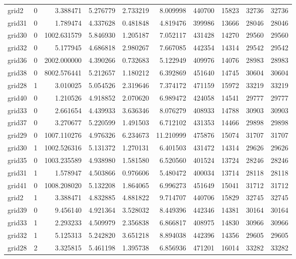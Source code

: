 \begin{longtable}{|l|r|r|r|r|r|r|r|r|r|}
grid2 & 0 & 3.388471 & 5.276779 & 2.733219 & 8.009998 & 440700 & 15823 & 32736 & 32736 \\
grid31 & 0 & 1.789474 & 4.337628 & 0.481848 & 4.819476 & 399986 & 13666 & 28046 & 28046 \\
grid30 & 0 & 1002.631579 & 5.846930 & 1.205187 & 7.052117 & 431428 & 14270 & 29560 & 29560 \\
grid32 & 0 & 5.177945 & 4.686818 & 2.980267 & 7.667085 & 442354 & 14314 & 29542 & 29542 \\
grid36 & 0 & 2002.000000 & 4.390266 & 0.732683 & 5.122949 & 409976 & 14076 & 28983 & 28983 \\
grid38 & 0 & 8002.576441 & 5.212657 & 1.180212 & 6.392869 & 451640 & 14745 & 30604 & 30604 \\
grid28 & 1 & 3.010025 & 5.054526 & 2.319646 & 7.374172 & 471159 & 15972 & 33219 & 33219 \\
grid40 & 0 & 1.210526 & 4.918852 & 2.070620 & 6.989472 & 424058 & 14541 & 29777 & 29777 \\
grid33 & 0 & 2.661654 & 4.439933 & 3.636346 & 8.076279 & 408933 & 14788 & 30903 & 30903 \\
grid37 & 0 & 3.270677 & 5.220599 & 1.491503 & 6.712102 & 431353 & 14466 & 29898 & 29898 \\
grid29 & 0 & 1007.110276 & 4.976326 & 6.234673 & 11.210999 & 475876 & 15074 & 31707 & 31707 \\
grid30 & 1 & 1002.526316 & 5.131372 & 1.270131 & 6.401503 & 431472 & 14314 & 29626 & 29626 \\
grid35 & 0 & 1003.235589 & 4.938980 & 1.581580 & 6.520560 & 401524 & 13724 & 28246 & 28246 \\
grid31 & 1 & 1.578947 & 4.503866 & 0.976606 & 5.480472 & 400034 & 13714 & 28118 & 28118 \\
grid41 & 0 & 1008.208020 & 5.132208 & 1.864065 & 6.996273 & 451649 & 15041 & 31712 & 31712 \\
grid2 & 1 & 3.388471 & 4.832885 & 4.881822 & 9.714707 & 440706 & 15829 & 32745 & 32745 \\
grid39 & 0 & 9.456140 & 4.921364 & 3.528032 & 8.449396 & 442346 & 14381 & 30164 & 30164 \\
grid33 & 1 & 2.293233 & 4.509979 & 2.356838 & 6.866817 & 408975 & 14830 & 30966 & 30966 \\
grid32 & 1 & 5.125313 & 5.242820 & 3.651218 & 8.894038 & 442396 & 14356 & 29605 & 29605 \\
grid28 & 2 & 3.325815 & 5.461198 & 1.395738 & 6.856936 & 471201 & 16014 & 33282 & 33282 \\

\end{longtable}
